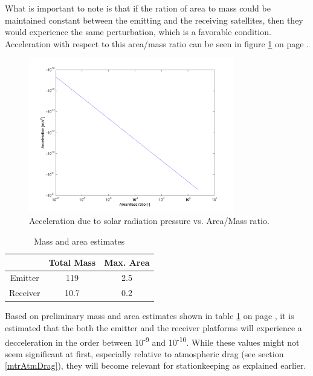 What is important to note is that if the ration of area to mass could be maintained constant between the emitting and the receiving satellites, then they would experience the same perturbation, which is a favorable condition. Acceleration with respect to this area/mass ratio can be seen in figure \ref{fig:solarRadRatio} on page \pageref{fig:solarRadRatio}.

\begin{figure}[h!]
\centering
\includegraphics[width=0.8\textwidth, angle=0]{chapters/img/solPressureVarRatio.png}
\caption{Acceleration due to solar radiation pressure vs. Area/Mass ratio.}
\label{fig:solarRadRatio}
\end{figure}

\begin{table}[h]
	\centering
		\begin{tabular}{c|c|c}
		 & Total Mass & Max. Area \\ \hline \hline
		 Emitter & 119 & 2.5 \\ 
		 Receiver & 10.7 & 0.2 
			
		\end{tabular}
	\caption{Mass and area estimates}
	\label{table:solarEstimates}
\end{table}

Based on preliminary mass and area estimates shown in table \ref{table:solarEstimates} on page \pageref{table:solarEstimates}, it is estimated that the both the emitter and the receiver platforms will experience a decceleration in the order between 10\textsuperscript{-9} and 10\textsuperscript{-10}. While these values might not seem significant at first, especially relative to atmospheric drag (see section \ref{mtrAtmDrag}), they will become relevant for stationkeeping as explained earlier.

